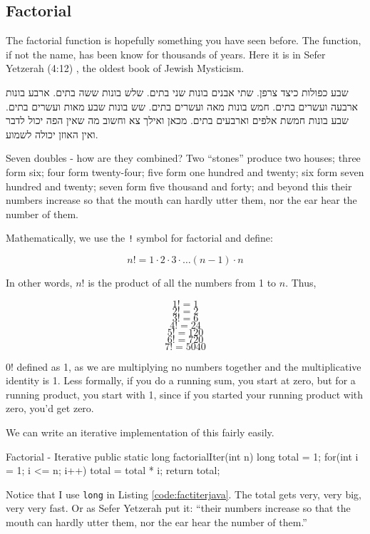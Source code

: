 \subsection{Factorial}
The factorial function is hopefully something you have seen before.  The function, if not the name, has been know for thousands of years.  Here it is in Sefer Yetzerah (4:12)\cite{sefery} \cite{mordell1914origin}, the oldest book of Jewish Mysticism.
\begin{displayquote}
\foreignlanguage{hebrew}{שבע כפולות כיצד צרפן. שתי אבנים בונות שני בתים. שלש בונות ששה בתים. ארבע בונות ארבעה ועשרים בתים. חמש בונות מאה ועשרים בתים. שש בונות שבע מאות ועשרים בתים. שבע בונות חמשת אלפים וארבעים בתים. מכאן ואילך צא וחשוב מה שאין הפה יכול לדבר ואין האוזן יכולה לשמוע.}

Seven doubles - how are they combined? Two ``stones'' produce two houses; three form six; four form twenty-four; five form one hundred and twenty; six form seven hundred and twenty; seven form five thousand and forty; and beyond this their numbers increase so that the mouth can hardly utter them, nor the ear hear the number of them.
\end{displayquote}
Mathematically, we use the \texttt{!} symbol for factorial and define:

$$n! = 1\cdot2\cdot3\cdot\dots (n-1)\cdot n$$  


In other words, $n!$ is the product of all the numbers from 1 to $n$.  Thus,

$$1! = 1$$
$$2! = 2$$
$$3! = 6$$
$$4! = 24$$
$$5! = 120$$
$$6! = 720$$
$$7! = 5040$$


$0!$ defined as 1, as we are multiplying no numbers together  and the multiplicative identity is 1. Less formally, if you do a running sum, you start at zero, but for a running product, you start with 1, since if you started your running product with zero, you'd get zero.

We can write an iterative implementation of this fairly easily.

\begin{javacode}[label={code:factiterjava}]{Factorial - Iterative}
public static long factorialIter(int n) {
	long total = 1;
	for(int i = 1; i <= n; i++) {
		total =  total * i;
	}
	return total;
}
\end{javacode}


Notice that I use \texttt{long} in Listing \ref{code:factiterjava}.  The total gets very, very big, very very fast.  Or as Sefer Yetzerah put it: ``their numbers increase so that the mouth can hardly utter them, nor the ear hear the number of them.''

